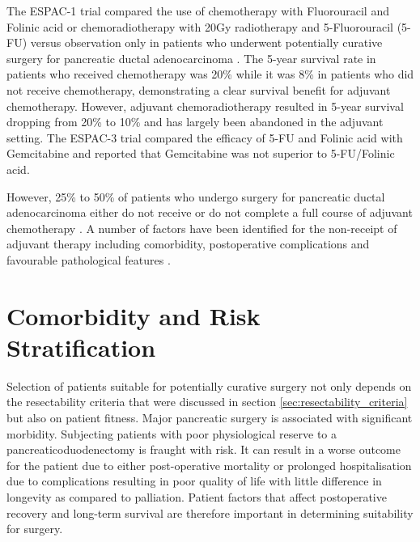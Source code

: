 The ESPAC-1 trial compared the use of chemotherapy with Fluorouracil and Folinic acid or chemoradiotherapy with 20Gy radiotherapy and 5-Fluorouracil (5-FU) versus observation only in patients who underwent potentially curative surgery for pancreatic ductal adenocarcinoma \parencite{neoptolemos_randomized_2004}. 
The 5-year survival rate in patients who received chemotherapy was 20\% while it was 8\% in patients who did not receive chemotherapy, demonstrating a clear survival benefit for adjuvant chemotherapy. 
However, adjuvant chemoradiotherapy resulted in 5-year survival dropping from 20\% to 10\% and has largely been abandoned in the adjuvant setting. 
The ESPAC-3 trial compared the efficacy of 5-FU and Folinic acid with Gemcitabine and reported that Gemcitabine was not superior to 5-FU/Folinic acid. \parencite{neoptolemos_adjuvant_2010}

However, 25\% to 50\% of patients who undergo surgery for pancreatic ductal adenocarcinoma either do not receive or do not complete a full course of adjuvant chemotherapy \parencite{sohn_resected_2000, neoptolemos_randomized_2004, oettle_adjuvant_2007}. 
A number of factors have been identified for the non-receipt of adjuvant therapy including comorbidity, postoperative complications and favourable pathological features \parencite{spitz_preoperative_1997, aloia_delayed_2007, oettle_adjuvant_2007, merchant_adjuvant_2009, russ_impact_2009}. 

\section{Comorbidity and Risk Stratification}
\label{sec:comorbidity_risk_stratification}
Selection of patients suitable for potentially curative surgery not only depends on the resectability criteria that were discussed in section \ref{sec:resectability_criteria} but also on patient fitness. 
Major pancreatic surgery is associated with significant morbidity. 
Subjecting patients with poor physiological reserve to a pancreaticoduodenectomy is fraught with risk. 
It can result in a worse outcome for the patient due to either post-operative mortality or prolonged hospitalisation due to complications resulting in poor quality of life with little difference in longevity as compared to palliation. 
Patient factors that affect postoperative recovery and long-term survival are therefore important in determining suitability for surgery.

